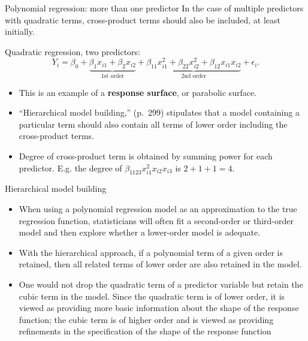 \documentclass{beamer}
\begin{document}
\begin{frame}{Polynomial regression: more than one predictor}
In the case of multiple predictors with quadratic terms,
cross-product terms should also be included, at least initially.
\vspace{10pt}

\pause {} Quadratic regression, two predictors:
$$
Y_i = \beta_0 + \underbrace{\beta_1 x_{i1} + \beta_2 x_{i2}}_{\text{1st order}} + \underbrace{\beta_{11} x_{i1}^2 + \beta_{22} x_{i2}^2 + \beta_{12} x_{i1} x_{i2}}_{\text{2nd order}} + \epsilon_i.
$$
\begin{itemize}
\item\pause This is an example of a \textbf{response surface}, or parabolic surface.
\item\pause ``Hierarchical model building,'' (p.~299) stipulates that a
model containing a particular term should also contain all terms of lower order including the cross-product terms.
\item\pause Degree of cross-product term is obtained by summing power 
for each predictor. E.g. the degree of $\beta_{1123} x_{i1}^2 x_{i2} x_{i3}$ is $2 + 1 + 1 = 4$.
\end{itemize}
\end{frame}

\begin{frame}{Hierarchical model building}
\begin{itemize}
\item\pause When using a polynomial regression model as an approximation to the true regression function, statisticians will
often fit a second-order or third-order model and then explore whether a lower-order model is adequate.
\item\pause With the
hierarchical approach, if a polynomial term of a given order is retained, then all related terms of lower order are also
retained in the model. 
\item\pause One would not drop the quadratic term of a predictor variable but retain the cubic
term in the model. \pause Since the quadratic term is of lower order, it is viewed as providing more basic information
about the shape of the response function; \pause the cubic term is of higher order and is viewed as providing refinements
in the specification of the shape of the response function
\end{itemize}
\end{frame}
\end{document}

